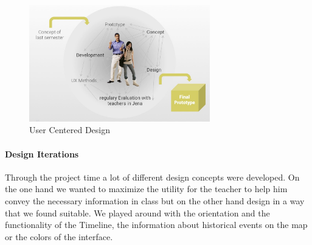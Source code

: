 \begin{figure}[H]
  \centering
  \includegraphics[width=0.7\textwidth]{graphics/design-1.jpg}
  \caption{User Centered Design}
\end{figure}

\paragraph{Design Iterations}
Through the project time a lot of different design concepts were developed. On the one hand we wanted to maximize the utility for the teacher to help him convey the necessary information in class but on the other hand design \HG in a way that we found suitable. We played around with the orientation and the functionality of the Timeline, the information about historical events on the map or the colors of the interface.


